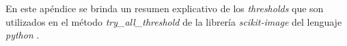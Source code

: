 \singlespacing
{}
\label{chap:apendthresh}

\pagestyle{plain}

En este apéndice se brinda un resumen explicativo de los \textit{thresholds} que son utilizados en el método \textit{try\_all\_threshold} de la librería \textit{scikit-image} del lenguaje \textit{python} \cite{van2014scikit}.

